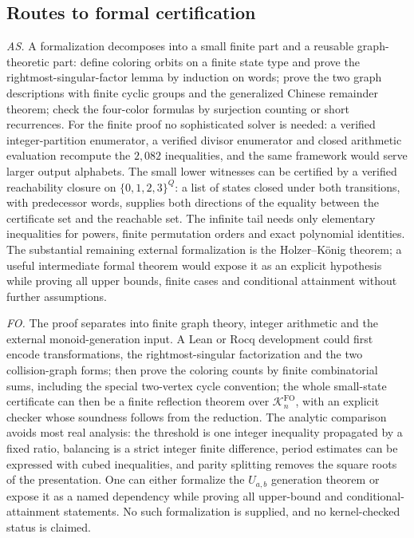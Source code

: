 \documentclass[11pt,a4paper]{article}
\numberwithin{equation}{section}
\theoremstyle{definition}
\theoremstyle{remark}
\begin{document}
\subsection{Routes to formal certification}\label{fo:sec:formal}

\emph{AS.} A formalization decomposes into a small finite part and a reusable
graph-theoretic part: define coloring orbits on a finite state type and prove
the rightmost-singular-factor lemma by induction on words; prove the two graph
descriptions with finite cyclic groups and the generalized Chinese remainder
theorem; check the four-color formulas by surjection counting or short
recurrences. For the finite proof no sophisticated solver is needed: a
verified integer-partition enumerator, a verified divisor enumerator and closed
arithmetic evaluation recompute the $2{,}082$ inequalities, and the same
framework would serve larger output alphabets. The small lower witnesses can be
certified by a verified reachability closure on $\{0,1,2,3\}^Q$: a list of
states closed under both transitions, with predecessor words, supplies both
directions of the equality between the certificate set and the reachable set.
The infinite tail needs only elementary inequalities for powers, finite
permutation orders and exact polynomial identities. The substantial remaining
external formalization is the Holzer--K\"onig theorem; a useful intermediate
formal theorem would expose it as an explicit hypothesis while proving all
upper bounds, finite cases and conditional attainment without further
assumptions.

\emph{FO.} The proof separates into finite graph theory, integer arithmetic
and the external monoid-generation input. A Lean or Rocq development could
first encode transformations, the rightmost-singular factorization and the two
collision-graph forms; then prove the coloring counts by finite combinatorial
sums, including the special two-vertex cycle convention; the whole small-state
certificate can then be a finite reflection theorem over
$\mathcal K^{\mathrm{FO}}_n$, with an explicit checker whose soundness follows
from the reduction. The analytic comparison avoids most real analysis: the
threshold is one integer inequality propagated by a fixed ratio, balancing is a
strict integer finite difference, period estimates can be expressed with cubed
inequalities, and parity splitting removes the square roots of the
presentation. One can either formalize the $U_{a,b}$ generation theorem or
expose it as a named dependency while proving all upper-bound and
conditional-attainment statements. No such formalization is supplied, and no
kernel-checked status is claimed.
\end{document}
